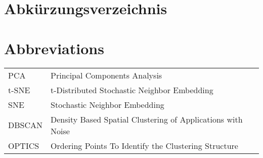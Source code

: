 \ifmmtlanguagegerman
\section*{Abkürzungsverzeichnis}
\else
\section*{Abbreviations}
\fi

\begin{table}[h]		
	\begin{tabular}{ll}
		PCA & Principal Components Analysis \\
		t-SNE & t-Distributed Stochastic Neighbor Embedding\\			
		SNE & Stochastic Neighbor Embedding\\			
		DBSCAN & Density Based Spatial Clustering of Applications with Noise\\			
		OPTICS & Ordering Points To Identify the Clustering Structure\\					
	\end{tabular}
\end{table}
